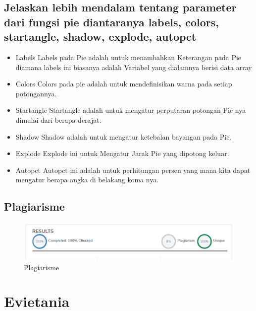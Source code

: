 \subsection{Jelaskan lebih mendalam tentang parameter dari fungsi pie diantaranya labels, colors, startangle, shadow, explode, autopct}
\begin{itemize}
	\item Labels\newline
	Labels pada Pie adalah untuk menambahkan Keterangan pada Pie diamana labels ini biasanya adalah Variabel yang dialamnya berisi data array
	\item Colors\newline
	Colors pada pie adalah untuk mendefinisikan warna pada setiap potongannya.
	\item Startangle\newline
	Startangle adalah untuk mengatur perputaran potongan Pie nya dimulai dari berapa derajat.
	\item Shadow\newline
	Shadow adalah untuk mengatur ketebalan bayangan pada Pie.
	\item Explode\newline
	Explode ini untuk Mengatur Jarak Pie yang dipotong keluar.
	\item Autopct\newline
	Autopct ini adalah untuk perhitungan persen yang mana kita dapat mengatur berapa angka di belakang koma nya. 
\end{itemize}

\subsection{Plagiarisme}
\begin{figure}[h]
\centering
\includegraphics[scale=0.2]{figures/6/Teori/1174025/noplg.png}
\caption{Plagiarisme}
\label{fig:plagiat}
\end{figure}

\section{Evietania}
